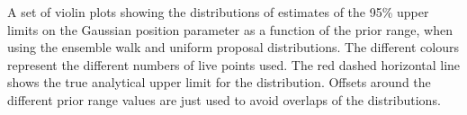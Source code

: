 \label{fig:walkunipropuls}
A set of violin plots showing the distributions of estimates of the 95\% upper limits on the Gaussian position parameter as a function of the prior range, when using the ensemble walk and uniform proposal distributions. The different colours represent the different numbers of live points  used. The red dashed horizontal line shows the true analytical upper limit for the distribution.
Offsets around the different prior range values are just used to avoid overlaps of the
distributions.
